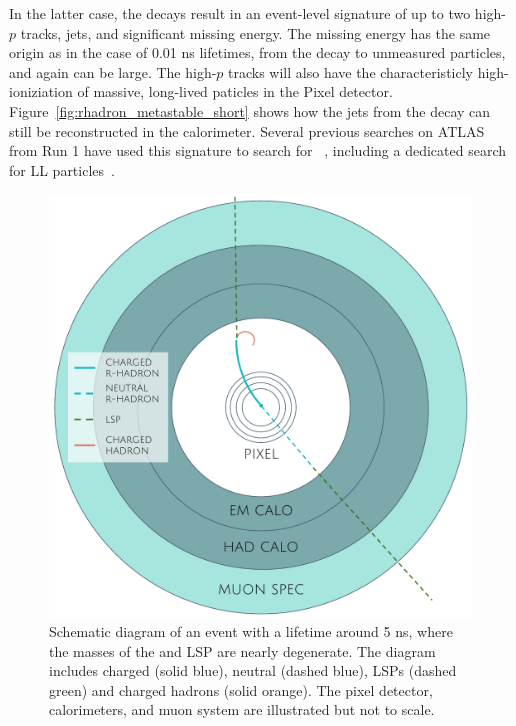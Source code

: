 In the latter case, the decays result in an event-level signature of up to two high-$p$ tracks, jets, and significant missing energy.
The missing energy has the same origin as in the case of 0.01 ns lifetimes, from the decay to unmeasured particles, and again can be large.
The high-$p$ tracks will also have the characteristicly high-ioniziation of massive, long-lived paticles in the Pixel detector.
Figure~\ref{fig:rhadron_metastable_short} shows how the jets from the decay can still be reconstructed in the calorimeter.
Several previous searches on ATLAS from Run 1 have used this signature to search for \rhadrons~\cite{SUSY-2012-01, SUSY-2013-22}, including a dedicated search for \ac{LL} particles~\cite{SUSY-2014-09}.

\begin{figure}[tb]
\centering
\includegraphics[width=\fullfig]{figures/rhadron_disappear.pdf}
\caption{Schematic diagram of an \rhadron event with a lifetime around 5 ns, where the masses of the \rhadron and \acs*{LSP} are nearly degenerate. The diagram includes charged \rhadrons (solid blue), neutral \rhadrons (dashed blue), \acsp*{LSP} (dashed green) and charged hadrons (solid orange). The pixel detector, calorimeters, and muon system are illustrated but not to scale.}
\label{fig:rhadron_disappear}
\end{figure}

